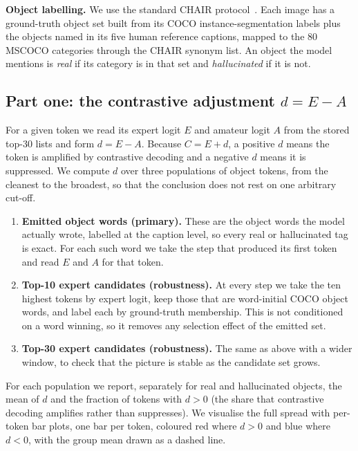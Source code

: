 \textbf{Object labelling.} We use the standard CHAIR
protocol~\citep{rohrbach2018chair}. Each image has a
ground-truth object set built from its COCO instance-segmentation labels plus the
objects named in its five human reference captions, mapped to the 80 MSCOCO
categories through the CHAIR synonym list. An object the model mentions is
\emph{real} if its category is in that set and \emph{hallucinated} if it is not.

\subsection{Part one: the contrastive adjustment \texorpdfstring{$d = E - A$}{d = E - A}}
\label{subsec:dproxy-danalysis}

For a given token we read its expert logit $E$ and amateur logit $A$ from the
stored top-30 lists and form $d = E - A$. Because $C = E + d$, a positive $d$
means the token is amplified by contrastive decoding and a negative $d$ means it
is suppressed. We compute $d$ over three populations of object tokens, from the
cleanest to the broadest, so that the conclusion does not rest on one arbitrary
cut-off.

\begin{enumerate}
  \item \textbf{Emitted object words (primary).} These are the object words the
  model actually wrote, labelled at the caption level, so every real or
  hallucinated tag is exact. For each such word we take the step that produced
  its first token and read $E$ and $A$ for that token.
  \item \textbf{Top-10 expert candidates (robustness).} At every step we take the
  ten highest tokens by expert logit, keep those that are word-initial COCO
  object words, and label each by ground-truth membership. This is not
  conditioned on a word winning, so it removes any selection effect of the
  emitted set.
  \item \textbf{Top-30 expert candidates (robustness).} The same as above with a
  wider window, to check that the picture is stable as the candidate set grows.
\end{enumerate}

For each population we report, separately for real and hallucinated objects, the
mean of $d$ and the fraction of tokens with $d > 0$ (the share that contrastive
decoding amplifies rather than suppresses). We visualise the full spread with
per-token bar plots, one bar per token, coloured red where $d > 0$ and blue where
$d < 0$, with the group mean drawn as a dashed line.

